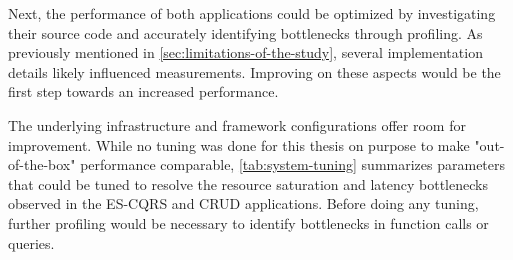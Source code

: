 Next, the performance of both applications could be optimized by investigating their source code and accurately identifying bottlenecks through profiling. As previously mentioned in \autoref{sec:limitations-of-the-study}, several implementation details likely influenced measurements. Improving on these aspects would be the first step towards an increased performance.

The underlying infrastructure and framework configurations offer room for improvement. While no tuning was done for this thesis on purpose to make "out-of-the-box" performance comparable, \autoref{tab:system-tuning} summarizes parameters that could be tuned to resolve the resource saturation and latency bottlenecks observed in the ES-CQRS and CRUD applications. Before doing any tuning, further profiling would be necessary to identify bottlenecks in function calls or queries.

